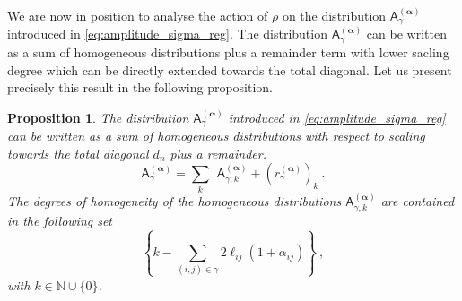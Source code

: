 \documentclass[11pt]{book}
\newcommand{\alphabd}{\boldsymbol{\alpha}}
\newcommand{\Asf}{\mathsf{A}}
\theoremstyle{break}
\newtheorem{proposition}{Proposition}
\begin{document}
We are now in position to analyse the action of $\rho$ on the distribution $\Asf_\gamma^{(\alphabd)}$ introduced in \eqref{eq:amplitude_sigma_reg}. The distribution $\Asf_\gamma^{(\alphabd)}$ can be written as a sum of homogeneous distributions plus a remainder term with lower sacling degree which can be directly extended towards the total diagonal. Let us present precisely this result in the following proposition.


\begin{proposition}\label{prop:almost_homo}
The distribution $\Asf_\gamma^{(\alphabd)}$ introduced in \eqref{eq:amplitude_sigma_reg} can be written as a sum of homogeneous distributions with respect to scaling towards the total diagonal $d_n$ plus a remainder.
%
\begin{equation*}
\Asf_\gamma^{(\alphabd)} = \sum_k \ \ \Asf_{\gamma,k}^{(\alphabd)} + \left(r_\gamma^{(\alphabd)}\right)_k \ .
\end{equation*}
%
The degrees of homogeneity of the homogeneous distributions $\Asf_{\gamma,k}^{(\alphabd)}$ are contained in the following set
%
\begin{equation*}
\left\{k-\sum_{(i,j)\in\gamma} 2 \ell_{ij}(1+ \alpha_{ij}) \right\} \ ,
\end{equation*}
%
with $k\in \mathbb{N}\cup \{0\}$.
\end{proposition}
\end{document}
